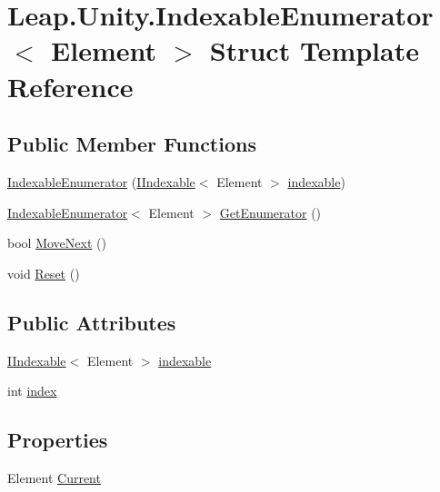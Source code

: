 \hypertarget{struct_leap_1_1_unity_1_1_indexable_enumerator}{}\section{Leap.\+Unity.\+Indexable\+Enumerator$<$ Element $>$ Struct Template Reference}
\label{struct_leap_1_1_unity_1_1_indexable_enumerator}
\subsection*{Public Member Functions}
\begin{DoxyCompactItemize}
\item 
\mbox{\hyperlink{struct_leap_1_1_unity_1_1_indexable_enumerator_a0892efa1a6f2ae6dfd60d0fa90e6970b}{Indexable\+Enumerator}} (\mbox{\hyperlink{interface_leap_1_1_unity_1_1_i_indexable}{I\+Indexable}}$<$ Element $>$ \mbox{\hyperlink{struct_leap_1_1_unity_1_1_indexable_enumerator_a133b45f67aaef544dc79c299df2d806f}{indexable}})
\item 
\mbox{\hyperlink{struct_leap_1_1_unity_1_1_indexable_enumerator}{Indexable\+Enumerator}}$<$ Element $>$ \mbox{\hyperlink{struct_leap_1_1_unity_1_1_indexable_enumerator_aff52e3b88b2b8fbacd03a282e7122d0a}{Get\+Enumerator}} ()
\item 
bool \mbox{\hyperlink{struct_leap_1_1_unity_1_1_indexable_enumerator_a39829b05d9c5f09d574fa5307b61257d}{Move\+Next}} ()
\item 
void \mbox{\hyperlink{struct_leap_1_1_unity_1_1_indexable_enumerator_a2f8cb0c4cc6fe8f3a7bda969602d07e1}{Reset}} ()
\end{DoxyCompactItemize}
\subsection*{Public Attributes}
\begin{DoxyCompactItemize}
\item 
\mbox{\hyperlink{interface_leap_1_1_unity_1_1_i_indexable}{I\+Indexable}}$<$ Element $>$ \mbox{\hyperlink{struct_leap_1_1_unity_1_1_indexable_enumerator_a133b45f67aaef544dc79c299df2d806f}{indexable}}
\item 
int \mbox{\hyperlink{struct_leap_1_1_unity_1_1_indexable_enumerator_aad76bb9479cdaf40e31fc8f0c50fa49a}{index}}
\end{DoxyCompactItemize}
\subsection*{Properties}
\begin{DoxyCompactItemize}
\item 
Element \mbox{\hyperlink{struct_leap_1_1_unity_1_1_indexable_enumerator_ad6735363a94b75a2c73b3a18202c2784}{Current}}
\end{DoxyCompactItemize}


